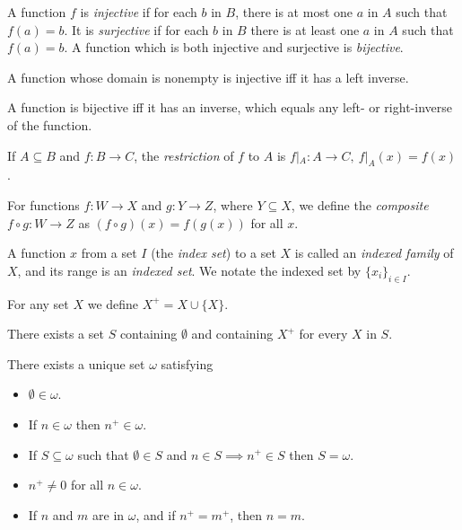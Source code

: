 \begin{defn}
  A function $f$ is \emph{injective} if for each $b$ in $B$, there is at most one
  $a$ in $A$ such that $f(a)=b$. It is \emph{surjective} if for each $b$ in
  $B$ there is at least one $a$ in $A$ such that $f(a)=b$. A function which is
  both injective and surjective is \emph{bijective}.
\end{defn}
\begin{prop}
  A function whose domain is nonempty is injective iff it has a left inverse.
\end{prop}
\begin{prop}
  A function is bijective iff it has an inverse, which equals any left- or
  right-inverse of the function.
\end{prop}
\begin{defn}
  If $A\subseteq B$ and $f:B\to C$, the \emph{restriction} of $f$ to $A$ is
  $f|_A:A\to C,\ f|_A(x)=f(x)$.
\end{defn}
\begin{defn}
  For functions $f:W\to X$ and $g:Y\to Z$, where $Y\subseteq X$, we define the
  \emph{composite} $f\circ g:W\to Z$ as $(f\circ g)(x)=f(g(x))$ for all $x$.
\end{defn}
\begin{defn}
  A function $x$ from a set $I$ (the \emph{index set}) to a set $X$ is called an
  \emph{indexed family} of $X$, and its range is an \emph{indexed set}. We
  notate the indexed set by $\{x_i\}_{i\in I}$.
\end{defn}
\begin{defn}
  For any set $X$ we define $X^+=X\cup\{X\}$.
\end{defn}
\begin{axiom}[Infinity]
  There exists a set $S$ containing $\emptyset$ and containing $X^+$ for
  every $X$ in $S$.
\end{axiom}
\begin{prop}
  There exists a unique set $\omega$ satisfying
  \begin{itemize}
    \item $\emptyset\in\omega$.
    \item If $n\in\omega$ then $n^+\in\omega$.
    \item If $S\subseteq\omega$ such that $\emptyset\in S$ and $n\in S\implies
      n^+\in S$ then $S=\omega$.
    \item $n^+\ne 0$ for all $n\in \omega$.
    \item If $n$ and $m$ are in $\omega$, and if $n^+=m^+$, then $n=m$.
  \end{itemize}
\end{prop}
